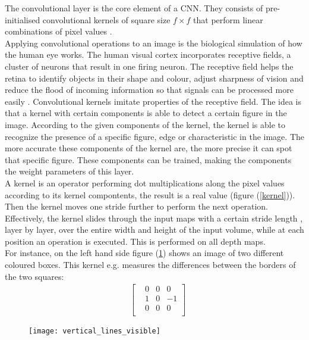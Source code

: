 \documentclass{article}
\begin{document}
The convolutional layer is the core element of a CNN. They consists of pre-initialised convolutional kernels of square size $f \times f$ that perform linear combinations of pixel values \cite{wiki_convnets}.\\
Applying convolutional operations to an image is the biological simulation of how the human eye works. The human visual cortex incorporates receptive fields, a cluster of neurons that result in one firing neuron. The receptive field helps the retina to identify objects in their shape and colour, adjust sharpness of vision and reduce the flood of incoming information so that signals can be processed more easily \cite{receptive_field}. Convolutional kernels imitate properties of the receptive field.
The idea is that a kernel with certain components is able to detect a certain figure in the image. According to the given components of the kernel, the kernel is able to recognize the presence of a specific figure, edge or characteristic in the image. The more accurate these components of the kernel are, the more precise it can spot that specific figure. These components can be trained, making the components the weight parameters of this layer.\\
A kernel is an operator performing dot multiplications along the pixel values according to its kernel compontents, the result is a real value (figure (\ref{kernel})). Then the kernel moves one stride further to perform the next operation. Effectively, the kernel slides through the input maps with a certain stride length \cite{cs231:optimizers}, layer by layer, over the entire width and height of the input volume, while at each position an operation is executed. This is performed on all depth maps.\\  For instance, on the left hand side figure (\ref{box_to_lines}) shows an image of two different coloured boxes. This kernel e.g. measures the differences between the borders of the two squares: 
\begin{align*}
&\begin{bmatrix}
&0 &0 &0 \\
&1 &0 &-1 \\
&0 &0 &0 \\
\end{bmatrix}
\end{align*}
\cite{understanding_kernels}


\begin{figure}[!htb]
\vskip 0.2in
\begin{center}
\centerline{\texttt{[image: vertical\_lines\_visible]}}
\caption{\cite{understanding_kernels}}\label{box_to_lines}
\end{center}
\vskip -0.2in
\end{figure}
\end{document}
